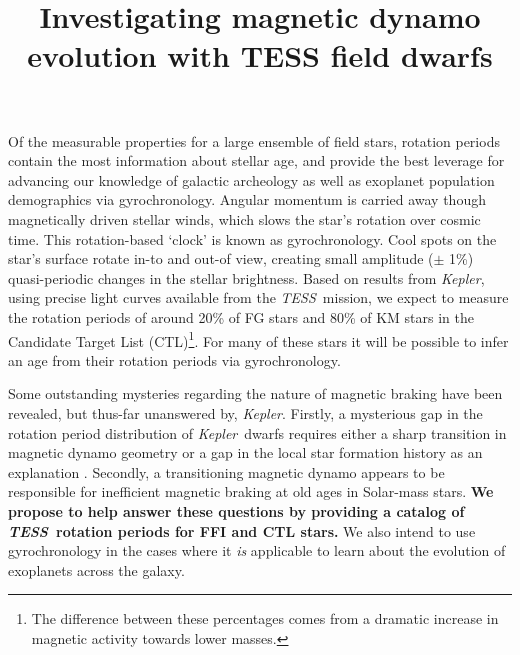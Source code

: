 \documentclass[letterpaper,12pt,preprint]{hack_aastex}
\newcommand{\Kepler}{{\it Kepler}}
\newcommand{\kepler}{\Kepler}
\newcommand{\TESS}{{\it TESS}}
\newcommand{\columbia}{1}
\newcommand{\ww}{2}
\newcommand{\cca}{3}
\newcommand{\florida}{4}
\newcommand{\princeton}{5}
\newcommand{\nsf}{4}
\newcommand{\simons}{2}
\newcommand{\hubble}{7}
\begin{document}
\title{Investigating magnetic dynamo evolution with TESS field dwarfs}



Of the measurable properties for a large ensemble of field stars, rotation
periods contain the most information about stellar age, and provide the best
leverage for advancing our knowledge of galactic archeology as well as
exoplanet population demographics via gyrochronology.
Angular momentum is carried away though magnetically driven stellar winds,
which slows the star's rotation over cosmic time.
This rotation-based `clock' is known as gyrochronology.
Cool spots on the star's surface rotate in-to and out-of view, creating small
amplitude ($\pm$ 1\%) quasi-periodic changes in the stellar brightness.
Based on results from \Kepler, using precise light curves available from the
\TESS\ mission, we expect to measure the rotation periods of around 20\% of FG
stars and 80\% of KM stars in the Candidate Target List (CTL)\footnote{The
difference between these percentages comes from a dramatic increase in
magnetic activity towards lower masses.}.
For many of these stars it will be possible to infer an age from their
rotation periods via gyrochronology.

Some outstanding mysteries regarding the nature of magnetic braking have been
revealed, but thus-far unanswered by, \kepler.
Firstly, a mysterious gap in the rotation period distribution of \Kepler\
dwarfs requires either a sharp transition in magnetic dynamo geometry or a gap
in the local star formation history as an explanation \citep{mcquillan2014,
davenport2017}.
Secondly, a transitioning magnetic dynamo appears to be responsible for
inefficient magnetic braking at old ages in Solar-mass stars.
{\bf We propose to help answer these questions by providing a catalog of \TESS\
rotation periods for FFI and CTL stars.}
We also intend to use gyrochronology in the cases where it {\it is} applicable
to learn about the evolution of exoplanets across the galaxy.
\end{document}
